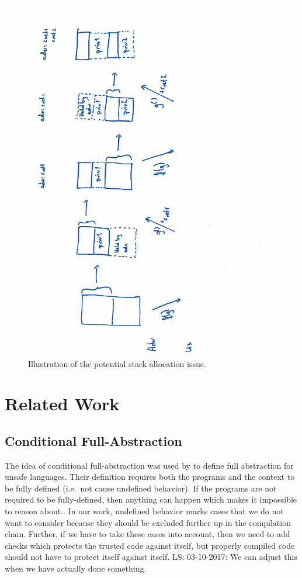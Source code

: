 \documentclass[a3paper]{article}
\newcommand\lau[1]{{\color{purple} \sf \footnotesize {LS: #1}}\\}
\begin{document}
\begin{figure}
  \centering
  \includegraphics[angle=270,trim={0 0 5cm 0},width=\textwidth]{img/stk-alloc.pdf}
  \caption{Illustration of the potential stack allocation issue.}
  \label{fig:stk-alloc}
\end{figure}



\section{Related Work}
\subsection{Conditional Full-Abstraction}
The idea of conditional full-abstraction was used by \citet{Juglaret2016} to define full abstraction for unsafe languages. Their definition requires both the programs and the context to be fully defined (i.e.\ not cause undefined behavior). If the programs are not required to be fully-defined, then anything can happen which makes it impossible to reason about.. In our work, undefined behavior marks cases that we do not want to consider because they should be excluded further up in the compilation chain. Further, if we have to take these cases into account, then we need to add checks which protects the trusted code against itself, but properly compiled code should not have to protect itself against itself.
\lau{03-10-2017: We can adjust this when we have actually done something.}


\end{document}
